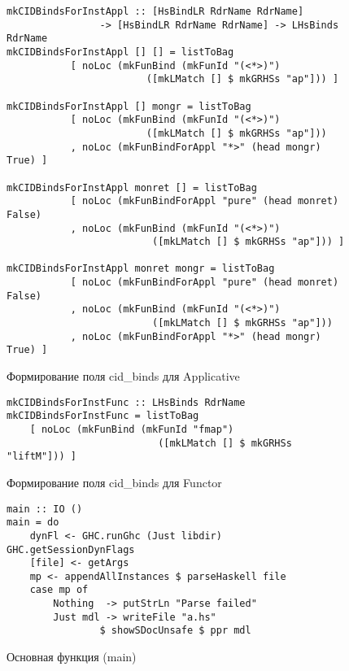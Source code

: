 \begin{figure}
\hrulefill
\begin{lstlisting}
mkCIDBindsForInstAppl :: [HsBindLR RdrName RdrName]
                -> [HsBindLR RdrName RdrName] -> LHsBinds RdrName
mkCIDBindsForInstAppl [] [] = listToBag 
           [ noLoc (mkFunBind (mkFunId "(<*>)") 
                        ([mkLMatch [] $ mkGRHSs "ap"])) ]
                        
mkCIDBindsForInstAppl [] mongr = listToBag
           [ noLoc (mkFunBind (mkFunId "(<*>)") 
                        ([mkLMatch [] $ mkGRHSs "ap"]))
           , noLoc (mkFunBindForAppl "*>" (head mongr) True) ]
           
mkCIDBindsForInstAppl monret [] = listToBag
           [ noLoc (mkFunBindForAppl "pure" (head monret) False)
           , noLoc (mkFunBind (mkFunId "(<*>)") 
                         ([mkLMatch [] $ mkGRHSs "ap"])) ]
                         
mkCIDBindsForInstAppl monret mongr = listToBag
           [ noLoc (mkFunBindForAppl "pure" (head monret) False)
           , noLoc (mkFunBind (mkFunId "(<*>)") 
                         ([mkLMatch [] $ mkGRHSs "ap"]))
           , noLoc (mkFunBindForAppl "*>" (head mongr) True) ]
\end{lstlisting}
\hrulefill
\caption{Формирование поля cid\_binds для Applicative}\label{cidbindsappl}
\end{figure}

\begin{figure}
\hrulefill
\begin{lstlisting}
mkCIDBindsForInstFunc :: LHsBinds RdrName
mkCIDBindsForInstFunc = listToBag
    [ noLoc (mkFunBind (mkFunId "fmap") 
                          ([mkLMatch [] $ mkGRHSs "liftM"])) ]
\end{lstlisting}
\hrulefill
\caption{Формирование поля cid\_binds для Functor}\label{cidbindsfunc}
\end{figure}

\begin{figure}
\hrulefill
\begin{lstlisting}
main :: IO ()
main = do
    dynFl <- GHC.runGhc (Just libdir) GHC.getSessionDynFlags
    [file] <- getArgs
    mp <- appendAllInstances $ parseHaskell file
    case mp of
        Nothing  -> putStrLn "Parse failed"
        Just mdl -> writeFile "a.hs" 
                $ showSDocUnsafe $ ppr mdl
\end{lstlisting}
\hrulefill
\caption{Основная функция (main)}\label{main}
\end{figure}

